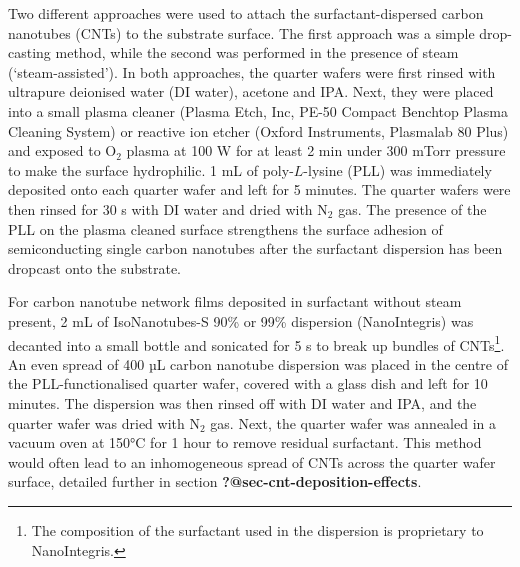 \documentclass[
  a4paper,
]{scrbook}
\begin{document}
Two different approaches were used to attach the surfactant-dispersed
carbon nanotubes (CNTs) to the substrate surface. The first approach was
a simple drop-casting method, while the second was performed in the
presence of steam (`steam-assisted'). In both approaches, the quarter
wafers were first rinsed with ultrapure deionised water (DI water),
acetone and IPA. Next, they were placed into a small plasma cleaner
(Plasma Etch, Inc, PE-50 Compact Benchtop Plasma Cleaning System) or
reactive ion etcher (Oxford Instruments, Plasmalab 80 Plus) and exposed
to O\(_2\) plasma at 100 W for at least 2 min under 300 mTorr pressure
to make the surface hydrophilic. 1 mL of poly-\(L\)-lysine (PLL) was
immediately deposited onto each quarter wafer and left for 5 minutes.
The quarter wafers were then rinsed for 30 s with DI water and dried
with N\(_2\) gas. The presence of the PLL on the plasma cleaned surface
strengthens the surface adhesion of semiconducting single carbon
nanotubes after the surfactant dispersion has been dropcast onto the
substrate.

For carbon nanotube network films deposited in surfactant without steam
present, 2 mL of IsoNanotubes-S 90\% or 99\% dispersion (NanoIntegris)
was decanted into a small bottle and sonicated for 5 s to break up
bundles of CNTs\footnote{The composition of the surfactant used in the
  dispersion is proprietary to NanoIntegris.}. An even spread of 400 µL
carbon nanotube dispersion was placed in the centre of the
PLL-functionalised quarter wafer, covered with a glass dish and left for
10 minutes. The dispersion was then rinsed off with DI water and IPA,
and the quarter wafer was dried with N\(_2\) gas. Next, the quarter
wafer was annealed in a vacuum oven at 150°C for 1 hour to remove
residual surfactant. This method would often lead to an inhomogeneous
spread of CNTs across the quarter wafer surface, detailed further in
section \textbf{?@sec-cnt-deposition-effects}.
\end{document}
